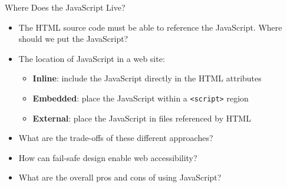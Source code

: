 \documentclass[14pt,aspectratio=169]{beamer}
\begin{document}
%
\begin{frame}{Where Does the JavaScript Live?}
  \begin{itemize}
    \item The HTML source code must be able to reference the JavaScript. Where
      should we put the JavaScript?
      \vspace*{-.15in}
    \item The location of JavaScript in a web site:
      \begin{itemize}
        \item {\bf Inline}: include the JavaScript directly in the HTML
          attributes
        \item {\bf Embedded}: place the JavaScript within a {\tt <script>}
          region
        \item {\bf External}: place the JavaScript in files referenced by HTML
      \end{itemize}
      \vspace*{-.2in}
    \item What are the trade-offs of these different approaches?
      \vspace*{-.2in}
    \item How can fail-safe design enable web accessibility?
      \vspace*{-.2in}
    \item What are the overall pros and cons of using JavaScript?
  \end{itemize}
\end{frame}
\end{document}
